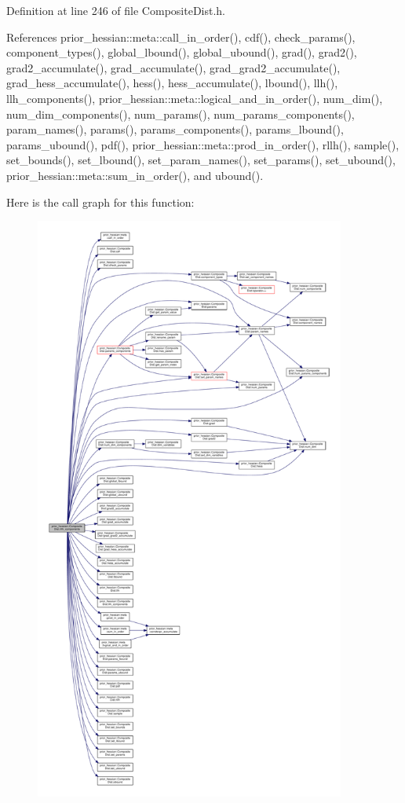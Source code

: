 Definition at line 246 of file Composite\+Dist.\+h.



References prior\+\_\+hessian\+::meta\+::call\+\_\+in\+\_\+order(), cdf(), check\+\_\+params(), component\+\_\+types(), global\+\_\+lbound(), global\+\_\+ubound(), grad(), grad2(), grad2\+\_\+accumulate(), grad\+\_\+accumulate(), grad\+\_\+grad2\+\_\+accumulate(), grad\+\_\+hess\+\_\+accumulate(), hess(), hess\+\_\+accumulate(), lbound(), llh(), llh\+\_\+components(), prior\+\_\+hessian\+::meta\+::logical\+\_\+and\+\_\+in\+\_\+order(), num\+\_\+dim(), num\+\_\+dim\+\_\+components(), num\+\_\+params(), num\+\_\+params\+\_\+components(), param\+\_\+names(), params(), params\+\_\+components(), params\+\_\+lbound(), params\+\_\+ubound(), pdf(), prior\+\_\+hessian\+::meta\+::prod\+\_\+in\+\_\+order(), rllh(), sample(), set\+\_\+bounds(), set\+\_\+lbound(), set\+\_\+param\+\_\+names(), set\+\_\+params(), set\+\_\+ubound(), prior\+\_\+hessian\+::meta\+::sum\+\_\+in\+\_\+order(), and ubound().



Here is the call graph for this function\+:\nopagebreak
\begin{figure}[H]
\begin{center}
\leavevmode
\includegraphics[height=550pt]{classprior__hessian_1_1CompositeDist_a24bac25ae8c0330b8a3aacadffc9d5ae_cgraph}
\end{center}
\end{figure}


